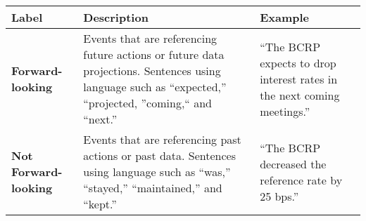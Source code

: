\begin{table*}
    \caption{}
    \vspace{1em}
    \begin{tabular}{p{}p{}p{}}
    \toprule
    \textbf{Label} & \textbf{Description} & \textbf{Example}\\
    \midrule
    \textbf{Forward-looking} & Events that are referencing future actions or future data projections. Sentences using language such as ``expected,'' ``projected, ''coming,`` and ``next.'' & ``The BCRP expects to drop interest rates in the next coming meetings.''\\
    \midrule
    \textbf{Not Forward-looking} & Events that are referencing past actions or past data. Sentences using language such as ``was,'' ``stayed,'' ``maintained,'' and ``kept.'' & ``The BCRP decreased the reference rate by 25 bps.'' \\
    \bottomrule
    \end{tabular}
    \label{tb:bcrp_forward_looking_guide}
    \end{table*}
